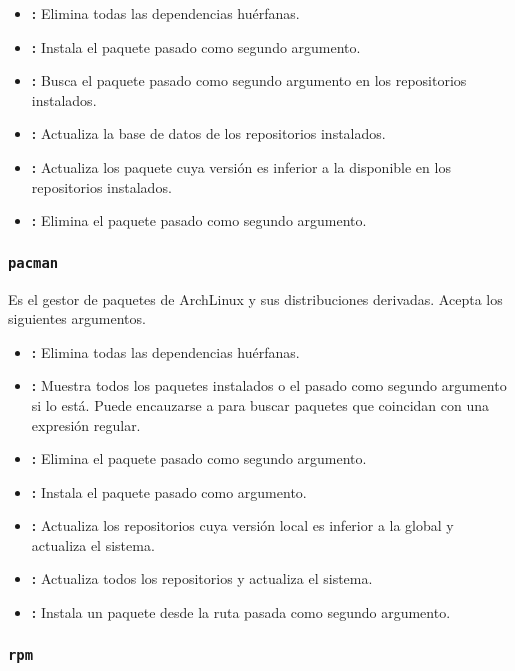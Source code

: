 \begin{itemize}
	\item{}\textbf{:} Elimina todas las dependencias huérfanas.
	\item{}\textbf{:} Instala el paquete pasado como segundo argumento.
	\item{}\textbf{:} Busca el paquete pasado como segundo argumento en los repositorios instalados.
	\item{}\textbf{:} Actualiza la base de datos de los repositorios instalados.
	\item{}\textbf{:} Actualiza los paquete cuya versión es inferior a la disponible en los repositorios instalados.
	\item{}\textbf{:} Elimina el paquete pasado como segundo argumento.
\end{itemize}

\subsubsection{\texttt{pacman}}

Es el gestor de paquetes de ArchLinux y sus distribuciones derivadas.
Acepta los siguientes argumentos.

\begin{itemize}
	\item{}\textbf{:} Elimina todas las dependencias huérfanas.
	\item{}\textbf{:} Muestra todos los paquetes instalados o el pasado como segundo argumento si lo está. Puede encauzarse a  para buscar paquetes que coincidan con una expresión regular.
	\item{}\textbf{:} Elimina el paquete pasado como segundo argumento.
	\item{}\textbf{:} Instala el paquete pasado como argumento.
	\item{}\textbf{:} Actualiza los repositorios cuya versión local es inferior a la global y actualiza el sistema.
	\item{}\textbf{:} Actualiza todos los repositorios y actualiza el sistema.
	\item{}\textbf{:} Instala un paquete desde la ruta pasada como segundo argumento.
\end{itemize}

\subsubsection{\texttt{rpm}}

